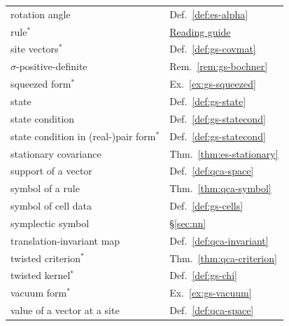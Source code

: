{\begin{minipage}[t]{0.49\textwidth}
\begin{tabular}[t]{@{}>{\raggedright\arraybackslash}p{}@{\quad}l@{}}
rotation angle & Def.~\ref{def:es-alpha}\\
rule$^*$ & \hyperref[sec:reading]{Reading guide}\\
site vectors$^*$ & Def.~\ref{def:gs-covmat}\\
$\sigma$-positive-definite & Rem.~\ref{rem:gs-bochner}\\
squeezed form$^*$ & Ex.~\ref{ex:gs-squeezed}\\
state & Def.~\ref{def:gs-state}\\
state condition & Def.~\ref{def:gs-statecond}\\
state condition in (real-)pair form$^*$ & Def.~\ref{def:gs-statecond}\\
stationary covariance & Thm.~\ref{thm:es-stationary}\\
support of a vector & Def.~\ref{def:qca-space}\\
symbol of a rule & Thm.~\ref{thm:qca-symbol}\\
symbol of cell data & Def.~\ref{def:gs-cells}\\
symplectic symbol & \S\ref{sec:nn}\\
translation-invariant map & Def.~\ref{def:qca-invariant}\\
twisted criterion$^*$ & Thm.~\ref{thm:qca-criterion}\\
twisted kernel$^*$ & Def.~\ref{def:gs-chi}\\
vacuum form$^*$ & Ex.~\ref{ex:gs-vacuum}\\
value of a vector at a site & Def.~\ref{def:qca-space}\\
\end{tabular}
\end{minipage}}
